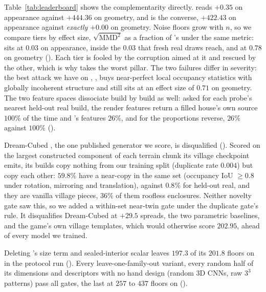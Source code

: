 Table~\ref{tab:leaderboard} shows the complementarity directly. \solidify{} reads $+0.35$
on appearance against $+444.36$ on geometry, and \matshuffle{} is the converse, $+422.43$
on appearance against \emph{exactly} $+0.00$ on geometry. Noise floors grow with $n$, so
we compare tiers by effect size, $\sqrt{\text{MMD}^2}$ as a fraction of \randomvox{}'s
under the same metric: \solidify{} sits at $0.03$ on appearance, inside the $0.03$ that
fresh real draws reach, and at $0.78$ on geometry (). Each tier is fooled by the corruption aimed at it and
rescued by the other, which is why \blockscore{} takes the worst pillar. The two failures
differ in severity: the best attack we have on \vkid{}, \patchstitch{}, buys
near-perfect local occupancy statistics with globally incoherent structure and still sits
at an effect size of $0.71$ on geometry. The two feature spaces dissociate build by build as well: asked for each probe's
nearest held-out real build, the render features return a filled house's own source
$100\%$ of the time and \vkid{}'s features $26\%$, and for \matshuffle{} the proportions
reverse, $26\%$ against $100\%$ ().

Dream-Cubed \citep{merino2026dreamcubed}, the one published generator we score, is
disqualified (). Scored on the largest constructed component of
each terrain chunk its village checkpoint emits, its builds copy nothing from our training
split (duplicate rate $0.004$) but copy each other: $59.8\%$ have a near-copy in the same
set (occupancy IoU $\geq 0.8$ under rotation, mirroring and translation), against $0.8\%$
for held-out real, and they are vanilla village pieces, $36\%$ of them roofless
enclosures. Neither novelty gate saw this, so we added a within-set near-twin gate under
the duplicate gate's rule. It disqualifies Dream-Cubed at $+29.5$ spreads, the two
parametric baselines, and the game's own village templates, which would otherwise score
$202.95$, ahead of every model we trained.

Deleting \vkid{}'s size term and sealed-interior scalar leaves $197.3$ of its $201.8$
floors on \solidify{} in the protocol run (). Every leave-one-family-out variant, every random half of its
dimensions and descriptors with no hand design (random 3D CNNs, raw $3^3$ patterns) pass
all gates, the last at $257$ to $437$ floors on \solidify{} ().

